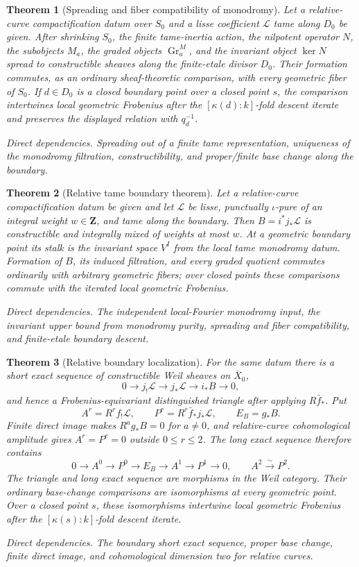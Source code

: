 \documentclass[10pt]{article}
\newtheorem{theorem}{Theorem}[section]
\theoremstyle{definition}
\newcommand{\dep}[1]{\par\smallskip\noindent\textit{Direct dependencies.} #1\par}
\begin{document}
\begin{theorem}[Spreading and fiber compatibility of monodromy]
Let a relative-curve compactification datum over \(S_0\) and a lisse
coefficient \(\mathcal L\) tame along \(D_0\) be given.  After shrinking
\(S_0\), the finite tame-inertia action, the nilpotent
operator \(N\), the subobjects \(M_a\), the graded objects
\(\operatorname{Gr}_a^M\), and the invariant object \(\ker N\) spread to
constructible sheaves along the finite-etale divisor \(D_0\).  Their
formation commutes, as an ordinary sheaf-theoretic comparison, with every
geometric fiber of \(S_0\).  If \(d\in D_0\) is a closed boundary point
over a closed point \(s\), the comparison intertwines local geometric
Frobenius after the \([\kappa(d):k]\)-fold descent iterate and preserves the
displayed relation with \(q_d^{-1}\).
\dep{Spreading out of a finite tame representation, uniqueness of the
monodromy filtration, constructibility, and proper/finite base change along
the boundary.}
\end{theorem}

\begin{theorem}[Relative tame boundary theorem]
Let a relative-curve compactification datum be given and let
\(\mathcal L\) be lisse, punctually \(\iota\)-pure of an integral weight
\(w\in\mathbf Z\), and tame along the boundary.  Then
\(B=i^*j_*\mathcal L\) is constructible and integrally mixed of weights
at most \(w\).  At a geometric boundary point its stalk is the invariant
space \(V^I\) from the local tame monodromy datum.  Formation of \(B\), its
induced filtration, and every graded quotient commutes ordinarily with
arbitrary geometric fibers; over closed points these comparisons commute
with the iterated local geometric Frobenius.
\dep{The independent local-Fourier monodromy input, the invariant upper
bound from monodromy purity, spreading and fiber compatibility, and
finite-etale boundary descent.}
\end{theorem}

\begin{theorem}[Relative boundary localization]
For the same datum there is a short exact sequence of constructible Weil
sheaves on \(\overline X_0\),
\[
 0\longrightarrow j_!\mathcal L\longrightarrow j_*\mathcal L
   \longrightarrow i_*B\longrightarrow0,
\]
and hence a Frobenius-equivariant distinguished triangle after applying
\(R\bar f_*\).  Put
\[
 A^r=R^rf_!\mathcal L,\qquad
 P^r=R^r\bar f_*j_*\mathcal L,\qquad
 E_B=g_*B.
\]
Finite direct image makes \(R^ag_*B=0\) for \(a\ne0\), and relative-curve
cohomological amplitude gives \(A^r=P^r=0\) outside \(0\le r\le2\).  The
long exact sequence therefore contains
\[
 0\to A^0\to P^0\to E_B\to A^1\to P^1\to0,
 \qquad A^2\xrightarrow{\sim}P^2.
\]
The triangle and long exact sequence are morphisms in the Weil category.
Their ordinary base-change comparisons are isomorphisms at every geometric
point.  Over a closed point \(s\), these isomorphisms intertwine local
geometric Frobenius after the \([\kappa(s):k]\)-fold descent iterate.
\dep{The boundary short exact sequence, proper base change, finite direct
image, and cohomological dimension two for relative curves.}
\end{theorem}
\end{document}
